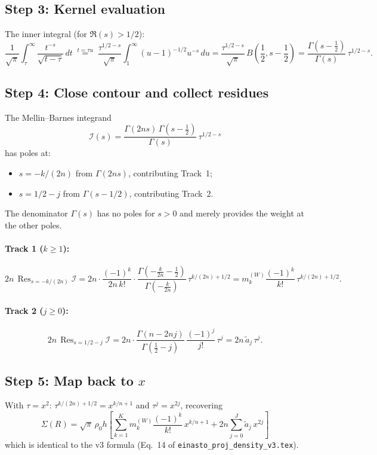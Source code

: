 \documentclass{article}
\newcommand{\Res}{\operatorname{Res}}
\begin{document}
\subsection{Step 3: Kernel evaluation}

The inner integral (for $\Re(s)>1/2$):
\[
\frac{1}{\sqrt\pi}\int_\tau^\infty\frac{t^{-s}}{\sqrt{t-\tau}}\,dt
\;\overset{t=\tau u}{=}\;
\frac{\tau^{1/2-s}}{\sqrt\pi}\int_1^\infty(u-1)^{-1/2}u^{-s}\,du
= \frac{\tau^{1/2-s}}{\sqrt\pi}\,B({\textstyle\frac12},s-{\textstyle\frac12})
= \frac{\Gamma(s-\frac12)}{\Gamma(s)}\,\tau^{1/2-s}.
\]

\subsection{Step 4: Close contour and collect residues}

The Mellin--Barnes integrand
\[
\mathcal{I}(s) = \frac{\Gamma(2ns)\,\Gamma(s-\tfrac12)}{\Gamma(s)}\,\tau^{1/2-s}
\]
has poles at:
\begin{itemize}
\item $s=-k/(2n)$ from $\Gamma(2ns)$, contributing Track~1;
\item $s=1/2-j$ from $\Gamma(s-1/2)$, contributing Track~2.
\end{itemize}
The denominator $\Gamma(s)$ has no poles for $s>0$ and merely provides the
weight at the other poles.

\paragraph{Track 1 ($k\ge1$):}
\[
2n\,\Res_{s=-k/(2n)}\mathcal{I}
= 2n\cdot\frac{(-1)^k}{2n\,k!}\cdot
\frac{\Gamma(-\frac{k}{2n}-\frac12)}{\Gamma(-\frac{k}{2n})}\,\tau^{k/(2n)+1/2}
= m_k^{(W)}\frac{(-1)^k}{k!}\,\tau^{k/(2n)+1/2}.
\]

\paragraph{Track 2 ($j\ge0$):}
\[
2n\,\Res_{s=1/2-j}\mathcal{I}
= 2n\cdot\frac{\Gamma(n-2nj)}{\Gamma(\frac12-j)}\,\frac{(-1)^j}{j!}\,\tau^j
= 2n\,\tilde{a}_j\,\tau^j.
\]

\subsection{Step 5: Map back to $x$}

With $\tau=x^2$: $\tau^{k/(2n)+1/2}=x^{k/n+1}$ and $\tau^j=x^{2j}$, recovering
\[
\Sigma(R) = \sqrt\pi\,\rho_0 h\left[
\sum_{k=1}^K m_k^{(W)}\frac{(-1)^k}{k!}\,x^{k/n+1}
+ 2n\sum_{j=0}^J\tilde{a}_j\,x^{2j}\right]
\]
which is identical to the v3 formula (Eq.~14 of \texttt{einasto\_proj\_density\_v3.tex}).
\end{document}
